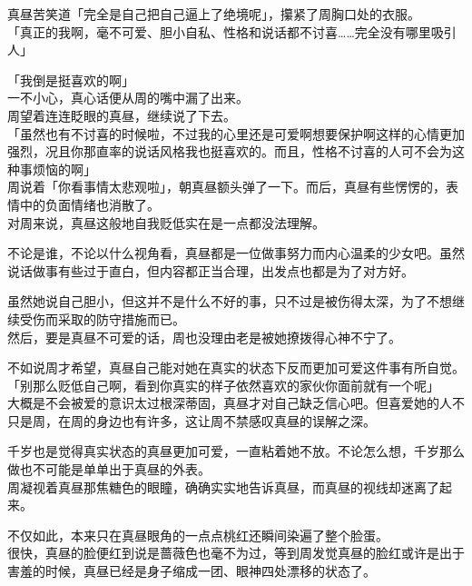真昼苦笑道「完全是自己把自己逼上了绝境呢」，攥紧了周胸口处的衣服。\\

「真正的我啊，毫不可爱、胆小自私、性格和说话都不讨喜……完全没有哪里吸引人」

「我倒是挺喜欢的啊」\\

一不小心，真心话便从周的嘴中漏了出来。\\

周望着连连眨眼的真昼，继续说了下去。\\

「虽然也有不讨喜的时候啦，不过我的心里还是可爱啊想要保护啊这样的心情更加强烈，况且你那直率的说话风格我也挺喜欢的。而且，性格不讨喜的人可不会为这种事烦恼的啊」\\

周说着「你看事情太悲观啦」，朝真昼额头弹了一下。而后，真昼有些愣愣的，表情中的负面情绪也消散了。\\

对周来说，真昼这般地自我贬低实在是一点都没法理解。

不论是谁，不论以什么视角看，真昼都是一位做事努力而内心温柔的少女吧。虽然说话做事有些过于直白，但内容都正当合理，出发点也都是为了对方好。

虽然她说自己胆小，但这并不是什么不好的事，只不过是被伤得太深，为了不想继续受伤而采取的防守措施而已。\\

然后，要是真昼不可爱的话，周也没理由老是被她撩拨得心神不宁了。

不如说周才希望，真昼自己能对她在真实的状态下反而更加可爱这件事有所自觉。\\

「别那么贬低自己啊，看到你真实的样子依然喜欢的家伙你面前就有一个呢」\\

大概是不会被爱的意识太过根深蒂固，真昼才对自己缺乏信心吧。但喜爱她的人不只是周，在周的身边也有许多，这让周不禁感叹真昼的误解之深。

千岁也是觉得真实状态的真昼更加可爱，一直粘着她不放。不论怎么想，千岁那么做也不可能是单单出于真昼的外表。\\

周凝视着真昼那焦糖色的眼瞳，确确实实地告诉真昼，而真昼的视线却迷离了起来。

不仅如此，本来只在真昼眼角的一点点桃红还瞬间染遍了整个脸蛋。\\

很快，真昼的脸便红到说是蔷薇色也毫不为过，等到周发觉真昼的脸红或许是出于害羞的时候，真昼已经是身子缩成一团、眼神四处漂移的状态了。\\

